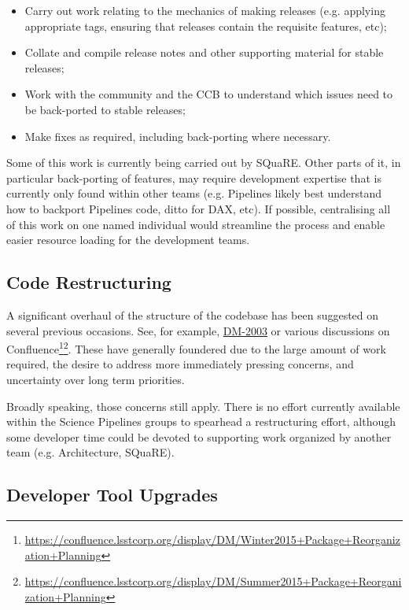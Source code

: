 \documentclass[DM,toc]{lsstdoc}
\begin{document}
\begin{itemize}

  \item{Carry out work relating to the mechanics of making releases (e.g.
  applying appropriate tags, ensuring that releases contain the requisite
  features, etc);}
  \item{Collate and compile release notes and other supporting material for
  stable releases;}
  \item{Work with the community and the CCB to understand which issues need to
  be back-ported to stable releases;}
  \item{Make fixes as required, including back-porting where necessary.}

\end{itemize}

Some of this work is currently being carried out by SQuaRE. Other parts of it,
in particular back-porting of features, may require development expertise that
is currently only found within other teams (e.g. Pipelines likely best
understand how to backport Pipelines code, ditto for DAX, etc). If possible,
centralising all of this work on one named individual would streamline the
process and enable easier resource loading for the development teams.

\subsection{Code Restructuring}
\label{sec:restructure}

A significant overhaul of the structure of the codebase has been suggested on
several previous occasions. See, for example,
\href{https://jira.lsstcorp.org/browse/DM-2003}{DM-2003} or various
discussions on
Confluence\footnote{\url{https://confluence.lsstcorp.org/display/DM/Winter2015+Package+Reorganization+Planning}}\footnote{\url{https://confluence.lsstcorp.org/display/DM/Summer2015+Package+Reorganization+Planning}}.
These have generally foundered due to the large amount of work required,
the desire to address more immediately pressing concerns, and uncertainty over
long term priorities.

Broadly speaking, those concerns still apply. There is no effort currently
available within the Science Pipelines groups to spearhead a restructuring
effort, although some developer time could be devoted to supporting work
organized by another team (e.g. Architecture, SQuaRE).

\subsection{Developer Tool Upgrades}
\label{sec:devtools}
\end{document}
